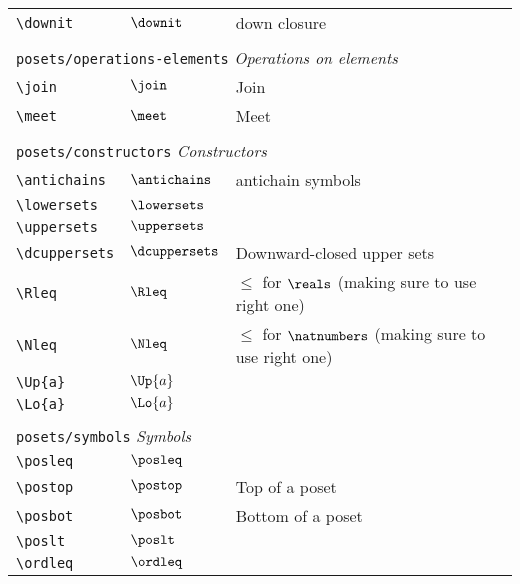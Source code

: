 \begin{longtable}{lll}
 {\color[rgb]{0.5,0.5,0.5}\texttt{\textbackslash downit}} & $\downit$ &  down closure\\ 
  &  & \\ 
 \multicolumn{3}{l}{{\color[rgb]{0.5,0.5,0.5}\texttt{posets/operations-elements}} \emph{Operations on elements}}\\ 
 \hline
{\color[rgb]{0.5,0.5,0.5}\texttt{\textbackslash join}} & $\join$ &  Join\\ 
 {\color[rgb]{0.5,0.5,0.5}\texttt{\textbackslash meet}} & $\meet$ &  Meet\\ 
  &  & \\ 
 \multicolumn{3}{l}{{\color[rgb]{0.5,0.5,0.5}\texttt{posets/constructors}} \emph{Constructors}}\\ 
 \hline
{\color[rgb]{0.5,0.5,0.5}\texttt{\textbackslash antichains}} & $\antichains$ &  antichain symbols\\ 
 {\color[rgb]{0.5,0.5,0.5}\texttt{\textbackslash lowersets}} & $\lowersets$ & \\ 
 {\color[rgb]{0.5,0.5,0.5}\texttt{\textbackslash uppersets}} & $\uppersets$ & \\ 
 {\color[rgb]{0.5,0.5,0.5}\texttt{\textbackslash dcuppersets}} & $\dcuppersets$ &  Downward-closed upper sets\\ 
 {\color[rgb]{0.5,0.5,0.5}\texttt{\textbackslash Rleq}} & $\Rleq$ &  $\leq$ for $\reals$ (making sure to use right one)\\ 
 {\color[rgb]{0.5,0.5,0.5}\texttt{\textbackslash Nleq}} & $\Nleq$ &  $\leq$ for $\natnumbers$ (making sure to use right one)\\ 
 {\color[rgb]{0.5,0.5,0.5}\texttt{\textbackslash Up\{a\}}} & $\Up{a}$ & \\ 
 {\color[rgb]{0.5,0.5,0.5}\texttt{\textbackslash Lo\{a\}}} & $\Lo{a}$ & \\ 
  &  & \\ 
 \multicolumn{3}{l}{{\color[rgb]{0.5,0.5,0.5}\texttt{posets/symbols}} \emph{Symbols}}\\ 
 \hline
{\color[rgb]{0.5,0.5,0.5}\texttt{\textbackslash posleq}} & $\posleq$ & \\ 
 {\color[rgb]{0.5,0.5,0.5}\texttt{\textbackslash postop}} & $\postop$ &  Top of a poset\\ 
 {\color[rgb]{0.5,0.5,0.5}\texttt{\textbackslash posbot}} & $\posbot$ &  Bottom of a poset\\ 
 {\color[rgb]{0.5,0.5,0.5}\texttt{\textbackslash poslt}} & $\poslt$ & \\ 
 {\color[rgb]{0.5,0.5,0.5}\texttt{\textbackslash ordleq}} & $\ordleq$ & \\ 

\end{longtable}
